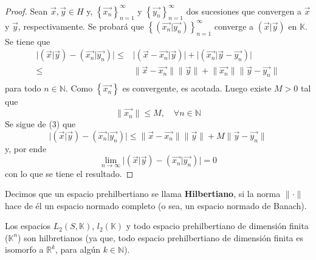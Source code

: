 \documentclass[12pt]{report}
\newcounter{it}
\theoremstyle{largebreak}
\newcommand\abs[1]{\ensuremath{\big|#1\big|}}
\newcommand\norm[1]{\ensuremath{\|#1\|}}
\newcommand\pint[2]{\ensuremath{\left(#1\big| #2\right)}}
\begin{document}
    \begin{proof}
        Sean $\vec{x},\vec{y}\in H$ y, $\left\{\vec{x_n} \right\}_{n=1}^\infty$ y $\left\{\vec{y_n} \right\}_{n=1}^\infty$ dos sucesiones que convergen a $\vec{x}$ y $\vec{y}$, respectivamente. Se probará que $\left\{\pint{\vec{x_n}}{\vec{y_n}} \right\}_{n=1}^\infty$ converge a $\pint{\vec{x}}{\vec{y}}$ en $\mathbb{K}$.
        Se tiene que
        \begin{equation}
            \begin{split}
                \abs{\pint{\vec{x}}{\vec{y}}-\pint{\vec{x_n}}{\vec{y_n}}}
                \leq&\abs{\pint{\vec{x}-\vec{x_n}}{\vec{y}}}+\abs{\pint{\vec{x_n}}{\vec{y}-\vec{y_n}}}\\
                \leq&\norm{\vec{x}-\vec{x_n}}\norm{\vec{y}}+\norm{\vec{x_n}}\norm{\vec{y}-\vec{y_n}}\\
            \end{split}
        \end{equation}
        para todo $n\in\mathbb{N}$. Como $\left\{\vec{x_n} \right\}$ es convergente, es acotada. Luego existe $M>0$ tal que
        \begin{equation*}
            \norm{\vec{x_n}}\leq M,\quad\forall n\in\mathbb{N}
        \end{equation*}
        Se sigue de (3) que
        \begin{equation*}
            \abs{\pint{\vec{x}}{\vec{y}}-\pint{\vec{x_n}}{\vec{y_n}}}
            \leq\norm{\vec{x}-\vec{x_n}}\norm{\vec{y}}+M\norm{\vec{y}-\vec{y_n}}
        \end{equation*}
        y, por ende
        \begin{equation*}
            \lim_{n\rightarrow\infty}\abs{\pint{\vec{x}}{\vec{y}}-\pint{\vec{x_n}}{\vec{y_n}}}=0
        \end{equation*}
        con lo que se tiene el resultado.
    \end{proof}

    \begin{mydef}
        Decimos que un espacio prehilbertiano se llama \textbf{Hilbertiano}, si la norma $\norm{\cdot}$ hace de él un espacio normado completo (o sea, un espacio normado de Banach).
    \end{mydef}

    \begin{exa}
        Los espacios $L_2(S,\mathbb{K})$, $l_2(\mathbb{K})$ y todo espacio prehilbertiano de dimensión finita ($\mathbb{K}^n$) son hilbretianos (ya que, todo espacio prehilbertiano de dimensión finita es isomorfo a $\mathbb{R}^k$, para algún $k\in\mathbb{N}$).
    \end{exa}
\end{document}
